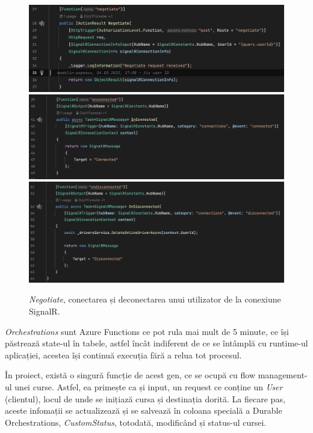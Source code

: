 \begin{figure}[H]
    \centering
    \includegraphics[width=16cm]{Assets/negotiate.png}
    \includegraphics[width=16cm]{Assets/onconnected.png}
    \includegraphics[width=16cm]{Assets/ondisconnected.png}
    \caption{\textit{Negotiate}, conectarea și deconectarea unui utilizator de la conexiune SignalR.}
    \label{fig:negotiateConnectDisconnect}
\end{figure}

\textit{Orchestrations} sunt Azure Functions ce pot rula mai mult de 5 minute, ce își păstrează
state-ul în tabele, astfel încât indiferent de ce se întâmplă cu runtime-ul aplicației,
acestea își continuă execuția fără a relua tot procesul.

În proiect, există o singură funcție de acest gen, ce se ocupă cu flow management-ul unei curse.
Astfel, ea primește ca și input, un request ce conține un \textit{User} (clientul), locul de unde se inițiază
cursa și destinația dorită. La fiecare pas, aceste infomații se actualizează și 
se salvează în coloana specială a Durable Orchestrations, \textit{CustomStatus}, totodată, modificând și status-ul
cursei.

